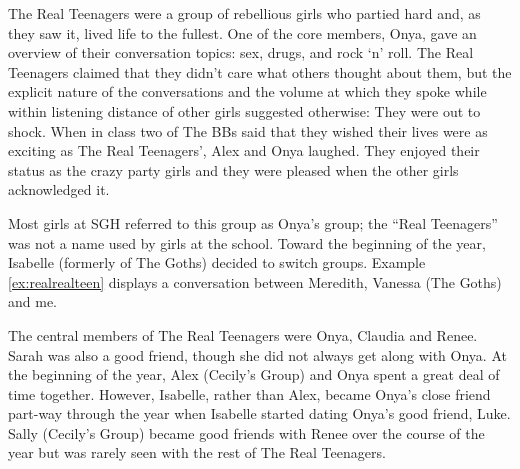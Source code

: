 \nocite{geertz1973}

The Real Teenagers were a group of rebellious girls who partied hard and, as they saw it, lived life to the fullest. One of the core members, Onya, gave an overview of their conversation topics: sex, drugs, and rock `n' roll. The Real Teenagers claimed that they didn't care what others thought about them, but the explicit nature of the conversations and the volume at which they spoke while within listening distance of other girls suggested otherwise: They were out to shock. When in class two of The BBs said that they wished their lives were as exciting as The Real Teenagers', Alex and Onya laughed. They enjoyed their status as the crazy party girls and they were pleased when the other girls acknowledged it.

\largerpage
Most girls at SGH referred to this group as Onya's group; the ``Real Teenagers'' was not a name used by girls at the school. Toward the beginning of the year, Isabelle (formerly of The Goths) decided to switch groups. Example \ref{ex:realrealteen} displays a conversation between Meredith, Vanessa (The Goths) and me. 

\label{ex:realrealteen}

\vspace{5 mm}

\noindent The central members of The Real Teenagers were Onya, Claudia and Renee. Sarah was also a good friend, though she did not always get along with Onya. At the beginning of the year, Alex (Cecily's Group) and Onya spent a great deal of time together. However, Isabelle, rather than Alex, became Onya's close friend part-way through the year when Isabelle started dating Onya's good friend, Luke. Sally (Cecily's Group) became good friends with Renee over the course of the year but was rarely seen with the rest of The Real Teenagers.

